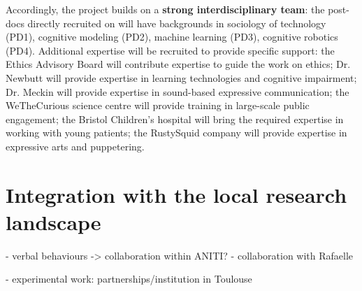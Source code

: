Accordingly, the project builds on a \textbf{strong interdisciplinary team}: the
post-docs directly recruited on \project will have backgrounds in sociology of
technology (PD1), cognitive modeling (PD2), machine learning (PD3), cognitive
robotics (PD4). Additional expertise will be recruited to provide specific
support: the \project Ethics Advisory Board will contribute expertise to guide
the work on ethics; Dr. Newbutt will provide expertise in learning technologies
and cognitive impairment; Dr. Meckin will provide expertise in sound-based
expressive communication; the WeTheCurious science centre will provide training in
large-scale public engagement; the Bristol Children's hospital will bring the
required expertise in working with young patients; the RustySquid company will provide expertise in
expressive arts and puppetering.

\section{Integration with the local research landscape}\label{collaborations}


- verbal behaviours -> collaboration within ANITI?
- collaboration with Rafaelle

- experimental work: partnerships/institution in Toulouse
